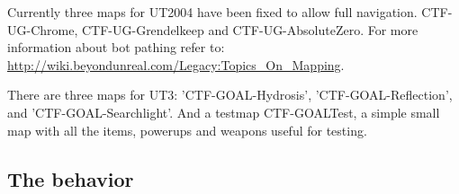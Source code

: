 \documentclass[11pt,a4paper]{article}
\begin{document}

Currently three maps for UT2004 have been fixed to allow full navigation. CTF-UG-Chrome, CTF-UG-Grendelkeep and CTF-UG-AbsoluteZero. For more information about bot pathing refer to: \url{http://wiki.beyondunreal.com/Legacy:Topics_On_Mapping}.

There are three maps for UT3:  'CTF-GOAL-Hydrosis', 'CTF-GOAL-Reflection', and 'CTF-GOAL-Searchlight'. And a testmap CTF-GOALTest, a simple small map with all the items, powerups and weapons useful for testing.

\subsection{The behavior}




 
\end{document}
